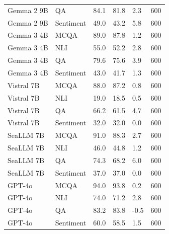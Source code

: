 \begin{tabular}{llllll}
  Gemma 2 9B &        QA &     84.1 &         81.8 &  2.3 &       600 \\
  Gemma 2 9B & Sentiment &     49.0 &         43.2 &  5.8 &       600 \\
  Gemma 3 4B &      MCQA &     89.0 &         87.8 &  1.2 &       600 \\
  Gemma 3 4B &       NLI &     55.0 &         52.2 &  2.8 &       600 \\
  Gemma 3 4B &        QA &     79.6 &         75.6 &  3.9 &       600 \\
  Gemma 3 4B & Sentiment &     43.0 &         41.7 &  1.3 &       600 \\
  Vistral 7B &      MCQA &     88.0 &         87.2 &  0.8 &       600 \\
  Vistral 7B &       NLI &     19.0 &         18.5 &  0.5 &       600 \\
  Vistral 7B &        QA &     66.2 &         61.5 &  4.7 &       600 \\
  Vistral 7B & Sentiment &     32.0 &         32.0 &  0.0 &       600 \\
   SeaLLM 7B &      MCQA &     91.0 &         88.3 &  2.7 &       600 \\
   SeaLLM 7B &       NLI &     46.0 &         44.8 &  1.2 &       600 \\
   SeaLLM 7B &        QA &     74.3 &         68.2 &  6.0 &       600 \\
   SeaLLM 7B & Sentiment &     37.0 &         37.0 &  0.0 &       600 \\
      GPT-4o &      MCQA &     94.0 &         93.8 &  0.2 &       600 \\
      GPT-4o &       NLI &     74.0 &         71.2 &  2.8 &       600 \\
      GPT-4o &        QA &     83.2 &         83.8 & -0.5 &       600 \\
      GPT-4o & Sentiment &     60.0 &         58.5 &  1.5 &       600 \\
\bottomrule
\end{tabular}
